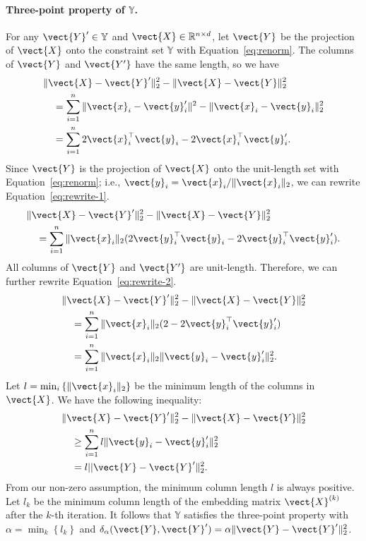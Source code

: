 \paragraph{Three-point property of $\mathbb{Y}$.}
For any $\vect{Y}' \in \mathbb{Y}$ and $\vect{X} \in \mathbb{R}^{n\times d}$,
let $\vect{Y}$ be the projection of $\vect{X}$ onto the constraint set
$\mathbb{Y}$ with Equation~\eqref{eq:renorm}.
The columns of $\vect{Y}$ and $\vect{Y'}$ have the same length, so we have
\begin{align}
  &\| \vect{X}-\vect{Y}' \|_2^2-\| \vect{X}-\vect{Y} \|_2^2 \nonumber \\
  & \quad = \sum_{i=1}^n \| \vect{x}_i-\vect{y}'_i \|^2-\| \vect{x}_i-\vect{y}_i \|_2^2 \nonumber\\
  & \quad = \sum_{i=1}^n 2\vect{x}_i^\top\vect{y}_i-2\vect{x}_i^\top\vect{y}'_i.
  \label{eq:rewrite-1}
\end{align}
Since $\vect{Y}$ is the projection of $\vect{X}$ onto the unit-length
set with Equation~\eqref{eq:renorm}; i.e., $\vect{y}_i = \vect{x}_i / \|\vect{x}_i\|_2$,
we can rewrite Equation~\eqref{eq:rewrite-1}.
\begin{align}
  &\| \vect{X}-\vect{Y}' \|_2^2-\| \vect{X}-\vect{Y} \|_2^2 \nonumber\\
  &\quad = \sum_{i=1}^n \|\vect{x}_i\|_2 (2\vect{y}_i^\top\vect{y}_i-2\vect{y}_i^\top\vect{y}'_i). \label{eq:rewrite-2}
\end{align}
All columns of $\vect{Y}$ and $\vect{Y'}$ are unit-length.  Therefore, we can
further rewrite Equation~\eqref{eq:rewrite-2}.
\begin{align*}
  &\| \vect{X}-\vect{Y}' \|_2^2-\| \vect{X}-\vect{Y} \|_2^2\\
  & \quad = \sum_{i=1}^n \| \vect{x}_i \|_2 (2- 2 \vect{y}_i^\top \vect{y}'_i)\\
  & \quad = \sum_{i=1}^n \| \vect{x}_i \|_2 \| \vect{y}_i-\vect{y}'_i \|_2^2.
\end{align*}
Let $l = \min_{i} \left\lbrace \|\vect{x}_i\|_2 \right\rbrace$ be the minimum
length of the columns in $\vect{X}$.  We have the following inequality:
\begin{align*}
  &\| \vect{X}-\vect{Y}' \|_2^2-\| \vect{X}-\vect{Y} \|_2^2\\
  & \quad \geq \sum_{i=1}^n l \| \vect{y}_i-\vect{y}'_i \|_2^2\\
  & \quad = l ||\vect{Y}-\vect{Y}'\|_2^2.
\end{align*}
From our non-zero assumption, the minimum column length $l$ is always positive.
Let $l_k$ be the minimum column length of the embedding matrix
$\vect{X}^{(k)}$ after the $k$-th iteration.  It follows that $\mathbb{Y}$
satisfies the three-point property with $\alpha = \min_{k} \left\lbrace l_k
\right\rbrace$ and $\delta_\alpha (\vect{Y}, \vect{Y}') = \alpha \| \vect{Y}
-\vect{Y}'\|_2^2$.

